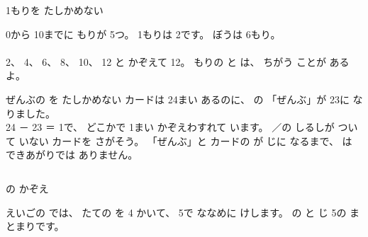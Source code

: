 \begin{tsumazuki}{1もりを たしかめない}
\noindent\begin{minipage}[c]{0.76\linewidth}
0から 10までに もりが 5つ。 1もりは 2です。 ぼうは 6もり。\\
\bkbatsu{}\hspace{3\zw}\bkmaru{}\\
2、 4、 6、 8、 10、 12 と かぞえて 12。 もりの と は、 ちがう ことが あるよ。
\end{minipage}\hfill
\begin{minipage}[c]{0.22\linewidth}\centering
{}
\end{minipage}
\end{tsumazuki}

\begin{tsumazuki}{ぜんぶの を たしかめない}
カードは 24まい あるのに、 の 「ぜんぶ」が 23に なりました。\\
24 － 23 ＝ 1で、 どこかで 1まい かぞえわすれて います。
／の しるしが ついて いない カードを さがそう。
「ぜんぶ」と カードの が じに なるまで、 は できあがりでは ありません。
\end{tsumazuki}

\begin{column}{の かぞえ}
\noindent\begin{minipage}[c]{0.79\linewidth}
えいごの では、 たての を 4 かいて、 5で ななめに けします。
の と じ 5の まとまりです。
\end{minipage}\hfill
\begin{minipage}[c]{0.19\linewidth}\centering
{}
\end{minipage}
\end{column}

